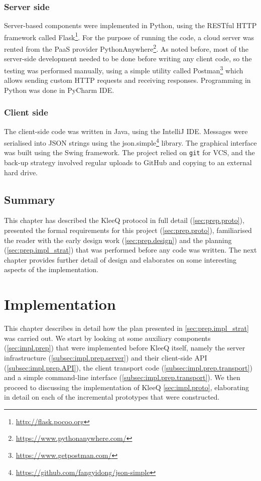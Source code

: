 \documentclass[a4paper, 12pt]{report}
\begin{document}
\subsection{Server side}
Server-based components were implemented in Python, using the RESTful HTTP framework called Flask\footnote{\url{http://flask.pocoo.org}}. For the purpose of running the code, a cloud server was rented from the PaaS provider PythonAnywhere\footnote{\url{https://www.pythonanywhere.com/}}. As noted before, most of the server-side development needed to be done before writing any client code, so the testing was performed manually, using a simple utility called Postman\footnote{\url{https://www.getpostman.com/}} which allows sending custom HTTP requests and receiving responses. Programming in Python was done in PyCharm IDE.

\subsection{Client side}
The client-side code was written in Java, using the IntelliJ IDE. Messages were serialised into JSON strings using the json.simple\footnote{\url{https://github.com/fangyidong/json-simple}} library. The graphical interface was built using the Swing framework. The project relied on \texttt{git} for VCS, and the back-up strategy involved regular uploads to GitHub and copying to an external hard drive.

\section{Summary}
This chapter has described the KleeQ protocol in full detail (\cref{sec:prep.proto}), presented the formal requirements for this project (\cref{sec:prep.proto}), familiarised the reader with the early design work (\cref{sec:prep.design}) and the planning (\cref{sec:prep.impl_strat}) that was performed before any code was written. The next chapter provides further detail of design and elaborates on some interesting aspects of the implementation.



\chapter{Implementation}
This chapter describes in detail how the plan presented in \cref{sec:prep.impl_strat} was carried out. We start by looking at some auxiliary components (\cref{sec:impl.prep}) that were implemented before KleeQ itself, namely the server infrastructure (\cref{subsec:impl.prep.server}) and their client-side API (\cref{subsec:impl.prep.API}), the client transport code (\cref{subsec:impl.prep.transport}) and a simple command-line interface (\cref{subsec:impl.prep.transport}). We then proceed to discussing the implementation of KleeQ \cref{sec:impl.proto}, elaborating in detail on each of the incremental prototypes that were constructed.
\end{document}
